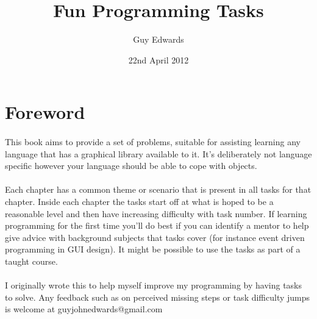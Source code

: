\documentclass[11pt]{book}
\author{Guy Edwards}
\date{22nd April 2012}
\title{Fun Programming Tasks}
\begin{document}
\maketitle

\section{Foreword}

\paragraph{} This book aims to provide a set of problems, suitable for
assisting learning any language that has a graphical library available to it.
It's deliberately not language specific however your language should be able
to cope with objects.

\paragraph{} Each chapter has a common theme or scenario that is present in
all tasks for that chapter. Inside each chapter the tasks start off at what is
hoped to be a reasonable level and then have increasing difficulty with task
number. If learning programming for the first time you'll do best if you can
identify a mentor to help give advice with background subjects that tasks
cover (for instance event driven programming in GUI design). It might be
possible to use the tasks as part of a taught course.

\paragraph{} I originally wrote this to help myself improve my programming by
having tasks to solve. Any feedback such as on perceived missing steps or task
difficulty jumps is welcome at guyjohnedwards@gmail.com

\tableofcontents
\end{document}
